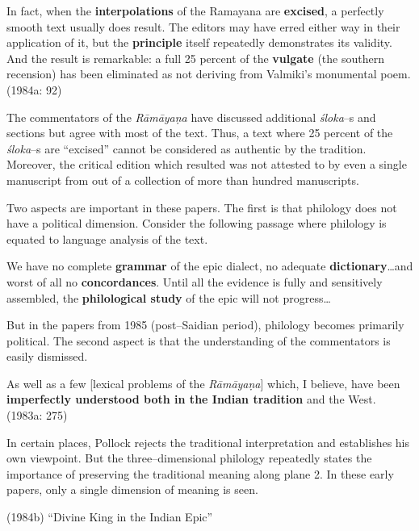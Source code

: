 \begin{myquote}
In fact, when the \textbf{interpolations} of the Ramayana are \textbf{excised}, a perfectly smooth text usually does result. The editors may have erred either way in their application of it, but the \textbf{principle} itself repeatedly demonstrates its validity. And the result is remarkable: a full 25 percent of the \textbf{vulgate} (the southern recension) has been eliminated as not deriving from Valmiki’s monumental poem. (1984a: 92)
\end{myquote}

The commentators of the \textit{Rāmāyaṇa }have discussed additional \textit{śloka}–s and sections but agree with most of the text. Thus, a text where 25 percent of the \textit{śloka}–s are “excised” cannot be considered as authentic by the tradition. Moreover, the critical edition which resulted was not attested to by even a single manuscript from out of a collection of more than hundred manuscripts.

Two aspects are important in these papers. The first is that philology does not have a political dimension. Consider the following passage where philology is equated to language analysis of the text.

\begin{myquote}
We have no complete \textbf{grammar} of the epic dialect, no adequate \textbf{dictionary}…and worst of all no \textbf{concordances}. Until all the evidence is fully and sensitively assembled, the \textbf{philological study} of the epic will not progress…
\end{myquote}

But in the papers from 1985 (post–Saidian period), philology becomes primarily political. The second aspect is that the understanding of the commentators is easily dismissed.

\begin{myquote}
As well as a few [lexical problems of the \textit{Rāmāyaṇa}] which, I believe, have been \textbf{imperfectly understood both in the Indian tradition} and the West. (1983a: 275)
\end{myquote}

In certain places, Pollock rejects the traditional interpretation and establishes his own viewpoint. But the three–dimensional philology repeatedly states the importance of preserving the traditional meaning along plane 2. In these early papers, only a single dimension of meaning is seen.

(1984b) “Divine King in the Indian Epic”

